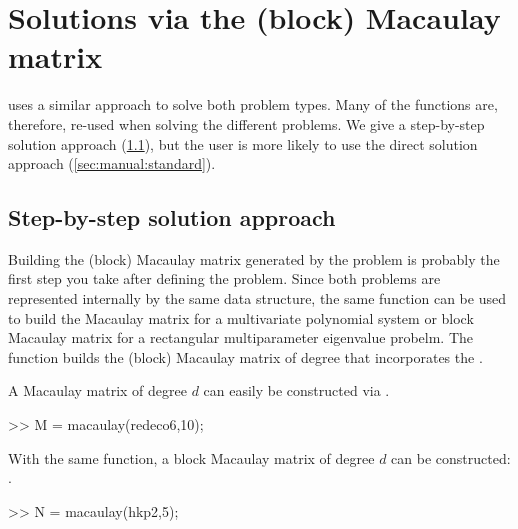 \documentclass{manual}
\begin{document}
    \section{Solutions via the (block) Macaulay matrix}
        \label{sec:manual:solutions}

        \maclab\space uses a similar approach to solve both problem types. 
        Many of the functions are, therefore, re-used when solving the different problems. 
        We give a step-by-step solution approach (\cref{sec:manual:stepbystep}), but the user is more likely to use the direct solution approach (\cref{sec:manual:standard}). 

        \subsection{Step-by-step solution approach}
            \label{sec:manual:stepbystep}

            Building the (block) Macaulay matrix generated by the problem is probably the first step you take after defining the problem.
            Since both problems are represented internally by the same data structure, the same function can be used to build the Macaulay matrix for a multivariate polynomial system or block Macaulay matrix for a rectangular multiparameter eigenvalue probelm.
            The function  builds the (block) Macaulay matrix of degree  that incorporates the .
            
            \begin{code}
                A Macaulay matrix of degree $d$ can easily be constructed via . 
                \begin{codeblock}
                    >> M = macaulay(redeco6,10);
                \end{codeblock}
                \noindent With the same function, a block Macaulay matrix of degree $d$ can be constructed: .
                \begin{codeblock} 
                    >> N = macaulay(hkp2,5);
                \end{codeblock}
            \end{code}
\end{document}
